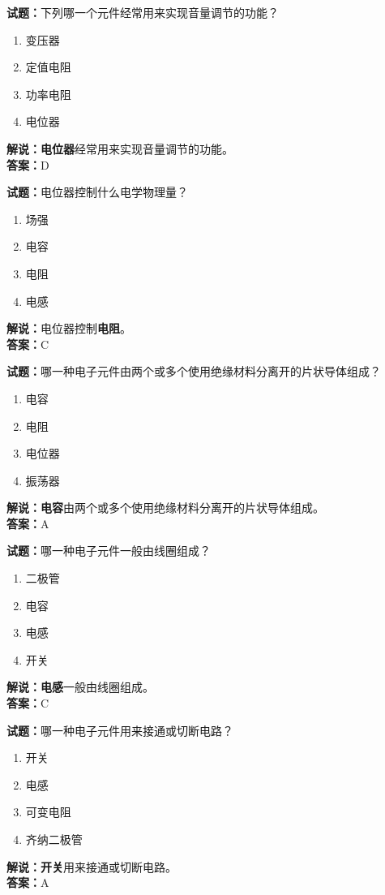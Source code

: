 \documentclass{ctexbook}
\begin{document}
\bigskip


\noindent\textbf{试题：}下列哪一个元件经常用来实现音量调节的功能？
\begin{enumerate}[leftmargin=3em]
\item 变压器
\item 定值电阻
\item 功率电阻
\item 电位器
\end{enumerate}
\noindent\textbf{解说：}\textbf{电位器}经常用来实现音量调节的功能。\\\noindent\textbf{答案：}D


\bigskip


\noindent\textbf{试题：}电位器控制什么电学物理量？
\begin{enumerate}[leftmargin=3em]
\item 场强
\item 电容
\item 电阻
\item 电感
\end{enumerate}
\noindent\textbf{解说：}电位器控制\textbf{电阻}。\\\noindent\textbf{答案：}C

\bigskip


\noindent\textbf{试题：}哪一种电子元件由两个或多个使用绝缘材料分离开的片状导体组成？
\begin{enumerate}[leftmargin=3em]
\item 电容
\item 电阻
\item 电位器
\item 振荡器
\end{enumerate}
\noindent\textbf{解说：}\textbf{电容}由两个或多个使用绝缘材料分离开的片状导体组成。\\\noindent\textbf{答案：}A


\bigskip


\noindent\textbf{试题：}哪一种电子元件一般由线圈组成？
\begin{enumerate}[leftmargin=3em]
\item 二极管
\item 电容
\item 电感
\item 开关
\end{enumerate}
\noindent\textbf{解说：}\textbf{电感}一般由线圈组成。\\\noindent\textbf{答案：}C



\bigskip


\noindent\textbf{试题：}哪一种电子元件用来接通或切断电路？
\begin{enumerate}[leftmargin=3em]
\item 开关
\item 电感
\item 可变电阻
\item 齐纳二极管
\end{enumerate}
\noindent\textbf{解说：}\textbf{开关}用来接通或切断电路。\\\noindent\textbf{答案：}A
\end{document}
